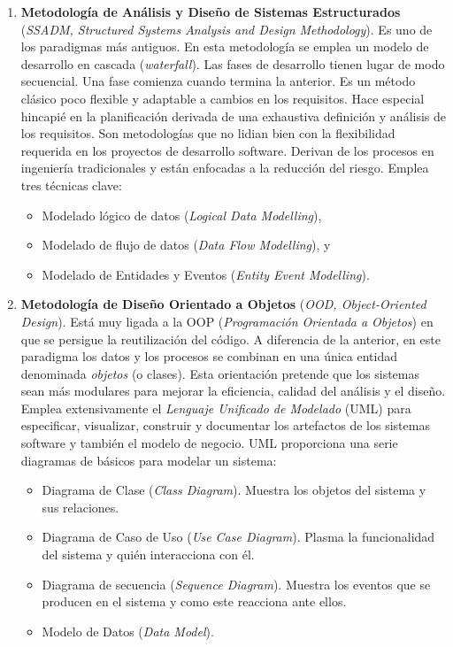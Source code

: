 \begin{enumerate}
\item \textbf{Metodología de Análisis y Diseño de Sistemas Estructurados} (\emph{SSADM, Structured Systems Analysis and Design Methodology}). Es uno de los paradigmas más antiguos. En esta metodología se emplea un modelo de desarrollo en cascada (\emph{waterfall}). Las fases de desarrollo tienen lugar de modo secuencial. Una fase comienza cuando termina la anterior. Es un método clásico poco flexible y adaptable a cambios en los requisitos. Hace especial hincapié en la planificación derivada de una exhaustiva definición y análisis de los requisitos. Son metodologías que no lidian bien con la flexibilidad requerida en los proyectos de desarrollo software. Derivan de los procesos en  ingeniería tradicionales y están enfocadas a la reducción del riesgo. Emplea tres técnicas clave:

\begin{itemize}
\item Modelado lógico de datos (\emph{Logical Data Modelling}),
\item Modelado de flujo de datos (\emph{Data Flow Modelling}), y
\item Modelado de Entidades y Eventos (\emph{Entity Event  Modelling}).
\end{itemize} 

\item \textbf{Metodología de Diseño Orientado a Objetos} (\emph{OOD,  Object-Oriented Design}). Está muy ligada a la OOP (\emph{Programación Orientada a Objetos}) en que se persigue la reutilización del código. A diferencia de la anterior, en este paradigma los datos y los procesos se combinan en una única entidad denominada \emph{objetos} (o clases). Esta orientación pretende que los sistemas sean más modulares para mejorar la eficiencia, calidad del análisis y el diseño. Emplea extensivamente el \emph{Lenguaje Unificado de Modelado} (UML) para especificar, visualizar, construir y documentar los artefactos de los sistemas software y  también el modelo de negocio. UML proporciona una serie diagramas de básicos para modelar un sistema: 

\begin{itemize}
\item Diagrama de Clase (\emph{Class Diagram}). Muestra los objetos del sistema y sus relaciones. 
\item Diagrama de Caso de Uso (\emph{Use Case Diagram}). Plasma la   funcionalidad del sistema y quién interacciona con él.
\item Diagrama de secuencia (\emph{Sequence Diagram}). Muestra los eventos que se producen en el sistema y como este reacciona ante ellos. 
\item Modelo de Datos (\emph{Data Model}).
\end{itemize} 
                               

\end{enumerate}
